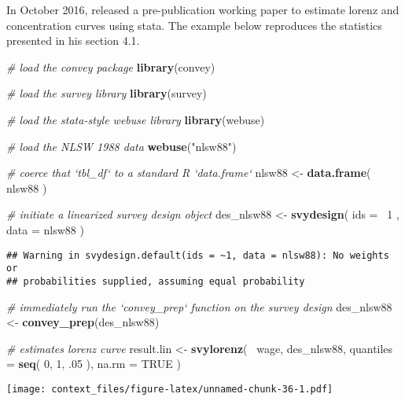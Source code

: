 \documentclass[]{book}
\newenvironment{Shaded}{\begin{snugshade}}{\end{snugshade}}
\newcommand{\KeywordTok}[1]{\textcolor[rgb]{0.13,0.29,0.53}{\textbf{{#1}}}}
\newcommand{\DataTypeTok}[1]{\textcolor[rgb]{0.13,0.29,0.53}{{#1}}}
\newcommand{\DecValTok}[1]{\textcolor[rgb]{0.00,0.00,0.81}{{#1}}}
\newcommand{\StringTok}[1]{\textcolor[rgb]{0.31,0.60,0.02}{{#1}}}
\newcommand{\CommentTok}[1]{\textcolor[rgb]{0.56,0.35,0.01}{\textit{{#1}}}}
\newcommand{\OtherTok}[1]{\textcolor[rgb]{0.56,0.35,0.01}{{#1}}}
\newcommand{\NormalTok}[1]{{#1}}
\begin{document}
In October 2016, \citep{jann2016} released a pre-publication working
paper to estimate lorenz and concentration curves using stata. The
example below reproduces the statistics presented in his section 4.1.

\begin{Shaded}
\begin{Highlighting}[]
\CommentTok{# load the convey package}
\KeywordTok{library}\NormalTok{(convey)}

\CommentTok{# load the survey library}
\KeywordTok{library}\NormalTok{(survey)}

\CommentTok{# load the stata-style webuse library}
\KeywordTok{library}\NormalTok{(webuse)}

\CommentTok{# load the NLSW 1988 data}
\KeywordTok{webuse}\NormalTok{(}\StringTok{"nlsw88"}\NormalTok{)}

\CommentTok{# coerce that `tbl_df` to a standard R `data.frame`}
\NormalTok{nlsw88 <-}\StringTok{ }\KeywordTok{data.frame}\NormalTok{( nlsw88 )}

\CommentTok{# initiate a linearized survey design object}
\NormalTok{des_nlsw88 <-}\StringTok{ }\KeywordTok{svydesign}\NormalTok{( }\DataTypeTok{ids =} \NormalTok{~}\DecValTok{1} \NormalTok{, }\DataTypeTok{data =} \NormalTok{nlsw88 )}
\end{Highlighting}
\end{Shaded}

\begin{verbatim}
## Warning in svydesign.default(ids = ~1, data = nlsw88): No weights or
## probabilities supplied, assuming equal probability
\end{verbatim}

\begin{Shaded}
\begin{Highlighting}[]
\CommentTok{# immediately run the `convey_prep` function on the survey design}
\NormalTok{des_nlsw88 <-}\StringTok{ }\KeywordTok{convey_prep}\NormalTok{(des_nlsw88)}

\CommentTok{# estimates lorenz curve}
\NormalTok{result.lin <-}\StringTok{ }\KeywordTok{svylorenz}\NormalTok{( ~wage, des_nlsw88, }\DataTypeTok{quantiles =} \KeywordTok{seq}\NormalTok{( }\DecValTok{0}\NormalTok{, }\DecValTok{1}\NormalTok{, .}\DecValTok{05} \NormalTok{), }\DataTypeTok{na.rm =} \OtherTok{TRUE} \NormalTok{)}
\end{Highlighting}
\end{Shaded}

\texttt{[image: context\_files/figure-latex/unnamed-chunk-36-1.pdf]}
\end{document}
